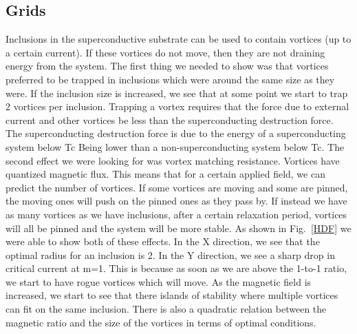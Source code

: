 \subsection{Grids}
Inclusions in the superconductive substrate can be used to contain vortices (up to a certain current). If these vortices do not move, then they are not draining energy from the system. The first thing we needed to show was that vortices preferred to be trapped in inclusions which were around the same size as they were. If the inclusion size is increased, we see that at some point we start to trap 2 vortices per inclusion. Trapping a vortex requires that the force due to external current and other vortices be less than the superconducting destruction force. The superconducting destruction force is due to the energy of a superconducting system below Tc Being lower than a non-superconducting system below Tc. The second effect we were looking for was vortex matching resistance. Vortices have quantized magnetic flux. This means that for a certain applied field, we can predict the number of vortices. If some vortices are moving and some are pinned, the moving ones will push on the pinned ones as they pass by. If instead we have as many vortices as we have inclusions, after a certain relaxation period, vortices will all be pinned and the system will be more stable. As shown in Fig.~\ref{HDF} we were able to show both of these effects. In the X direction, we see that the optimal radius for an inclusion is 2. In the Y direction, we see a sharp drop in critical current at m=1. This is because as soon as we are above the 1-to-1 ratio, we start to have rogue vortices which will move. As the magnetic field is increased, we start to see that there islands of stability where multiple vortices can fit on the same inclusion. There is also a quadratic relation between the magnetic ratio and the size of the vortices in terms of optimal conditions. 

